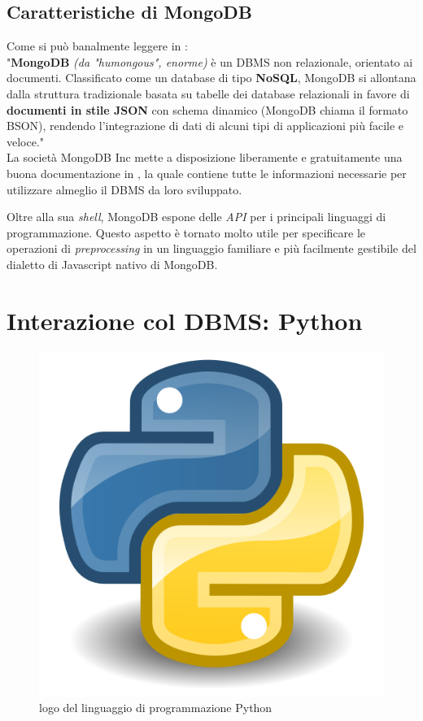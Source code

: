     \subsection{Caratteristiche di MongoDB}

        Come si può banalmente leggere in \cite{mongowiki}: \\
        
        "\textbf{MongoDB} \textit{(da "humongous", enorme)} è un DBMS non relazionale, orientato ai documenti. Classificato come un database di tipo \textbf{NoSQL}, MongoDB si allontana dalla struttura tradizionale basata su tabelle dei database relazionali in favore di \textbf{documenti in stile JSON} con schema dinamico (MongoDB chiama il formato BSON), rendendo l'integrazione di dati di alcuni tipi di applicazioni più facile e veloce." \\

        La società MongoDB Inc mette a disposizione liberamente e gratuitamente una buona documentazione in \cite{mongodb}, la quale contiene tutte le informazioni necessarie per utilizzare almeglio il DBMS da loro sviluppato. 

        Oltre alla sua \textit{shell}, MongoDB espone delle \textit{API} per i principali linguaggi di programmazione. Questo aspetto è tornato molto utile per specificare le operazioni di \textit{preprocessing} in un linguaggio familiare e più facilmente gestibile del dialetto di Javascript nativo di MongoDB.

\section{Interazione col DBMS: Python}

    \begin{figure}
        \centering
        \caption{logo del linguaggio di programmazione Python}
        \label{python_logo}
    	\includegraphics[scale=0.1]{img/python.png}
    \end{figure}


